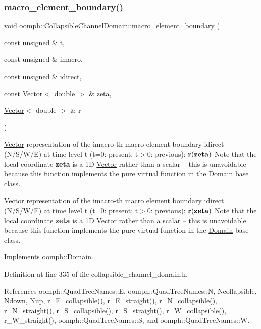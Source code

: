 \subsubsection{\texorpdfstring{macro\+\_\+element\+\_\+boundary()}{macro\_element\_boundary()}}
{\footnotesize\ttfamily void oomph\+::\+Collapsible\+Channel\+Domain\+::macro\+\_\+element\+\_\+boundary (\begin{DoxyParamCaption}\item[{const unsigned \&}]{t,  }\item[{const unsigned \&}]{imacro,  }\item[{const unsigned \&}]{idirect,  }\item[{const \hyperlink{classoomph_1_1Vector}{Vector}$<$ double $>$ \&}]{zeta,  }\item[{\hyperlink{classoomph_1_1Vector}{Vector}$<$ double $>$ \&}]{r }\end{DoxyParamCaption})\hspace{0.3cm}{\ttfamily [virtual]}}



\hyperlink{classoomph_1_1Vector}{Vector} representation of the imacro-\/th macro element boundary idirect (N/\+S/\+W/E) at time level t (t=0\+: present; t$>$0\+: previous)\+: $ {\bf r}({\bf zeta}) $ Note that the local coordinate {\bfseries zeta} is a 1D \hyperlink{classoomph_1_1Vector}{Vector} rather than a scalar -- this is unavoidable because this function implements the pure virtual function in the \hyperlink{classoomph_1_1Domain}{Domain} base class. 

\hyperlink{classoomph_1_1Vector}{Vector} representation of the imacro-\/th macro element boundary idirect (N/\+S/\+W/E) at time level t (t=0\+: present; t$>$0\+: previous)\+: $ {\bf r}({\bf zeta}) $ Note that the local coordinate {\bfseries zeta} is a 1D \hyperlink{classoomph_1_1Vector}{Vector} rather than a scalar -- this is unavoidable because this function implements the pure virtual function in the \hyperlink{classoomph_1_1Domain}{Domain} base class. 

Implements \hyperlink{classoomph_1_1Domain_a95f3e00d28ea37e6c4d3027bfac91096}{oomph\+::\+Domain}.



Definition at line 335 of file collapsible\+\_\+channel\+\_\+domain.\+h.



References oomph\+::\+Quad\+Tree\+Names\+::E, oomph\+::\+Quad\+Tree\+Names\+::N, Ncollapsible, Ndown, Nup, r\+\_\+\+E\+\_\+collapsible(), r\+\_\+\+E\+\_\+straight(), r\+\_\+\+N\+\_\+collapsible(), r\+\_\+\+N\+\_\+straight(), r\+\_\+\+S\+\_\+collapsible(), r\+\_\+\+S\+\_\+straight(), r\+\_\+\+W\+\_\+collapsible(), r\+\_\+\+W\+\_\+straight(), oomph\+::\+Quad\+Tree\+Names\+::S, and oomph\+::\+Quad\+Tree\+Names\+::W.



